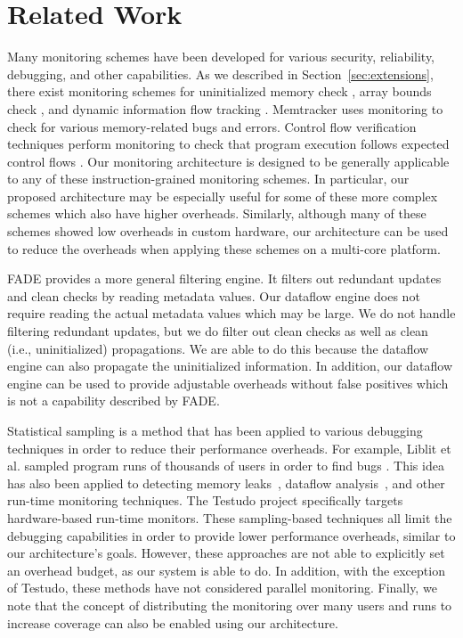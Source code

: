 \section{Related Work}
\label{sec:related}

Many monitoring schemes have been developed for various security, reliability,
debugging, and other capabilities.  As we described in
Section~\ref{sec:extensions}, there exist monitoring schemes for uninitialized
memory check \cite{mondrian-asplos02}, array bounds check
\cite{hardbound-asplos08, clause-ase07}, and dynamic information flow
tracking \cite{dift-asplos04, raksha-isca07, loki-osdi08}.
Memtracker \cite{memtracker-hpca07} uses monitoring to check for various
memory-related bugs and errors.  Control flow verification techniques perform
monitoring to check that program execution follows expected control flows
\cite{schuette-comp87, impres-dac06,
kayaalp-isca12}.  Our monitoring architecture is designed to
be generally applicable to any of these instruction-grained monitoring schemes.
In particular, our proposed architecture may be especially useful for some of
these more complex schemes which also have higher overheads.  Similarly,
although many of these schemes showed low overheads in custom hardware, our
architecture can be used to reduce the overheads when applying these schemes on
a multi-core platform.
 
FADE \cite{fade-hpca14} provides a more general filtering engine. It
filters out redundant updates and clean checks by reading metadata values. Our
dataflow engine does not require reading the actual metadata values which may
be large. We do not handle filtering redundant updates, but we do filter out
clean checks as well as clean (i.e., uninitialized) propagations. We are able
to do this because the dataflow engine can also propagate the uninitialized
information. In addition, our dataflow engine can be used to provide adjustable
overheads without false positives which is not a capability described by FADE.

Statistical sampling is a method that has been applied to various debugging
techniques in order to reduce their performance overheads. For example, Liblit
et al. sampled program runs of thousands of users in order to find bugs
\cite{liblit-pldi05}. This idea has also been applied to detecting memory
leaks~\cite{chilimbi-asplos04}, dataflow analysis~\cite{greathouse-cgo11}, and
other run-time monitoring techniques. The Testudo project
\cite{testudo-micro08} specifically targets hardware-based run-time monitors.
These sampling-based techniques all limit the debugging capabilities in order
to provide lower performance overheads, similar to our architecture's goals.
However, these approaches are not able to explicitly set an overhead budget, as
our system is able to do. In addition, with the exception of Testudo, these
methods have not considered parallel monitoring. Finally, we note that the
concept of distributing the monitoring over many users and runs to increase
coverage can also be enabled using our architecture.

